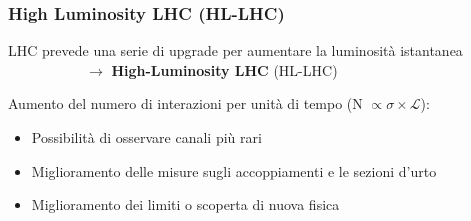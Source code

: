 \documentclass{beamer}
\begin{document}
\begin{frame}
\frametitle{High Luminosity LHC (HL-LHC)}
 {
LHC prevede una serie di upgrade per aumentare la luminosit\`a istantanea \\
\ \ \ \ \ \ \ \ \ \ \  $\rightarrow$ \textbf{High-Luminosity LHC} (HL-LHC)

Aumento del numero di interazioni per unit\`a di tempo (N $\propto \sigma \times \mathcal{L}$):\\
\begin{itemize}
\item Possibilit\`a di osservare canali pi\`u rari
\item Miglioramento delle misure sugli accoppiamenti e le sezioni d'urto
\item Miglioramento dei limiti o scoperta di nuova fisica
\end{itemize}}


\end{frame}
\end{document}

